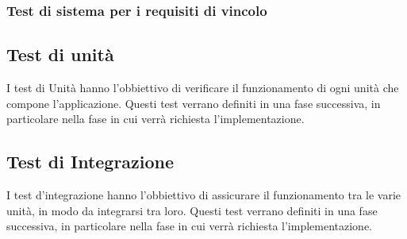\subsubsection{Test di sistema per i requisiti di vincolo}
    \def\testspecification{
    {   TSOV1,
        \raggedright Si verifica che il codice sorgente dell'applicazione sia opn source,
        NI,
        RVO1
    },
    {   TSDV",
        \raggedright Si verifica che l'applicazione sia sviluppata in Javascript con l'utilizzo della libreria d3.js,
        NI,
        RVD2 RVD2.1
    },
    {   TSDV2.2,
        \raggedright Si verifica che il beckend dell'applicazione sia sviluppato con node.js con l'utilizzo del framework express,
        NI,
        RVD2.2
    },
    {   TSDV2.3,
        \raggedright Si verifica che il frontend dell'applicazione sia sviluppato con React con l'utilizzo del framework Ant Design,
        NI,
        RVD2.3
    },
    {   TSOV3,
        \raggedright Si verifica che i dati siano convertibili in JSON,
        NI,
        RVO3
    },
    {   TSOV4,
        \raggedright Si verifica che nella visualizzazione Scatter Plot Matrix si possano visualizzare al massimo 5 features,
        NI,
        RVO4
    },
    {   TSDV5,
        \raggedright Si verifica che la libreria per PCA isa ml-pca,
        NI,
        RVD5
    },
    {   TSDV6,
        \raggedright Si verifica che la libreria per Umap sia tsne-js,
        NI,
        RVD6
    },
    {   TSDV7,
        \raggedright Si verifica che la libreria per t-SNE sia tsne-js,
        NI,
        RVD7
    },
    {   TSDV8,
        \raggedright Si verifica che la libreria per le distanze sia ml-distance,
        NI,
        RVD8
    },
    {   TSDV9,
        \raggedright Si verifica che la libreria per la matrice di correlazione sia jeezy,
        NI,
        RVD9
    },
      }
    
    
\subsection{Test di unità}
    I test di Unità hanno l'obbiettivo di verificare il funzionamento di ogni unità che compone l'applicazione. Questi test verrano definiti in una fase successiva, in particolare nella fase in cui verrà richiesta l'implementazione.
    
\subsection{Test di Integrazione}
    I test d'integrazione hanno l'obbiettivo di assicurare il funzionamento tra le varie unità, in modo da integrarsi tra loro. Questi test verrano definiti in una fase successiva, in particolare nella fase in cui verrà richiesta l'implementazione.
    
